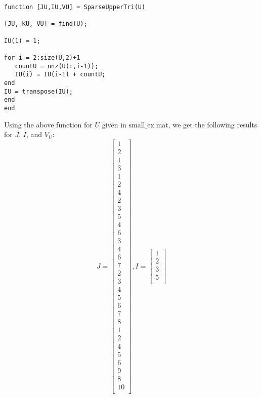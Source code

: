 \documentclass[12pt]{article}
\begin{document}
\begin{itemize}
\lstset{language=matlab,frame=single}
\begin{lstlisting}[caption= Generate $J\text{,}$ $I\text{,}$ and $V_U$ for Sparse Upper-Triangular Matrix]
function [JU,IU,VU] = SparseUpperTri(U)

[JU, KU, VU] = find(U);

IU(1) = 1;

for i = 2:size(U,2)+1
   countU = nnz(U(:,i-1));
   IU(i) = IU(i-1) + countU;
end
IU = transpose(IU);
end
end
\end{lstlisting}

Using the above function for $U$ given in $\text{small\_ex.mat}$, we get the following results for $J$, $I$, and $V_U$:\\
$$J = \begin{bmatrix} 
1\\
     2\\
     1\\
     3\\
     1\\
     2\\
     4\\
     2\\
     3\\
     5\\
     4\\
     6\\
     3\\
     4\\
     6\\
     7\\
     2\\
     3\\
     4\\
     5\\
     6\\
     7\\
     8\\
     1\\
     2\\
     4\\
     5\\
     6\\
     9\\
     8\\
    10\\
\end{bmatrix}, I = \begin{bmatrix}
1\\
     2\\
     3\\
     5\\

\end{bmatrix}$$
\end{itemize}
\end{document}
